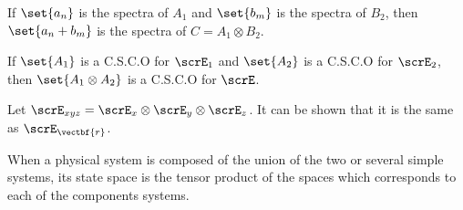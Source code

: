 If \(\set{a_n}\) is the spectra of \(A_1\) and \(\set{b_m}\) is the spectra of \(B_2\), then \(\set{a_n + b_m}\) is the spectra of \(C = A_1 \otimes B_2\). 

If \(\set{A_1}\) is a C.S.C.O for \(\scrE_1\) and \(\set{A_2}\) is a C.S.C.O for \(\scrE_2\), then \(\set{A_1 \otimes A_2}\) is a C.S.C.O for \(\scrE\).

Let \(\scrE_{xyz} = \scrE_x \otimes \scrE_y \otimes \scrE_z\). It can be shown that it is the same as \(\scrE_{\vectbf{r}}\). 

When a physical system is composed of the union of the two or several simple systems, its state space is the tensor product of the spaces which corresponds to each of the components systems.